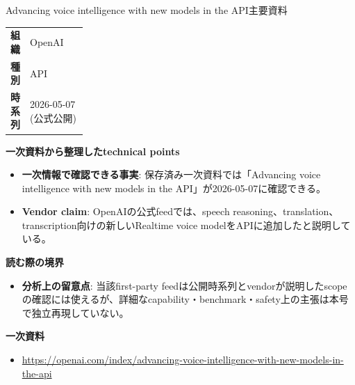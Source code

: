 \begin{technicalnote}{Advancing voice intelligence with new models in the API}{主要資料}
\begingroup
\begin{tabularx}{\linewidth}{@{}>{\bfseries}p{0.22\linewidth}X@{}}
組織 & OpenAI \\
種別 & API \\
時系列 & 2026-05-07 (公式公開) \\
\end{tabularx}
\smallskip
{\bfseries 一次資料から整理したtechnical points}
\begin{itemize}[leftmargin=1.5em,itemsep=0.35em]
\item \textbf{一次情報で確認できる事実}: 保存済み一次資料では「Advancing voice intelligence with new models in the API」が2026-05-07に確認できる。
\end{itemize}
\begin{minipage}{\linewidth}
\begin{itemize}[leftmargin=1.5em,itemsep=0.35em]
\item \textbf{Vendor claim}: OpenAIの公式feedでは、speech reasoning、translation、transcription向けの新しいRealtime voice modelをAPIに追加したと説明している。
\end{itemize}
{\bfseries 読む際の境界}
\begin{itemize}[leftmargin=1.5em,itemsep=0.35em]
\item \textbf{分析上の留意点}: 当該first-party feedは公開時系列とvendorが説明したscopeの確認には使えるが、詳細なcapability・benchmark・safety上の主張は本号で独立再現していない。
\end{itemize}
\begin{samepage}
{\bfseries 一次資料}
\begingroup\sloppy
\begin{itemize}[leftmargin=1.5em,itemsep=0.25em]
\item {\scriptsize\url{https://openai.com/index/advancing-voice-intelligence-with-new-models-in-the-api}}
\end{itemize}
\endgroup
\end{samepage}
\end{minipage}
\endgroup
\end{technicalnote}
\medskip


